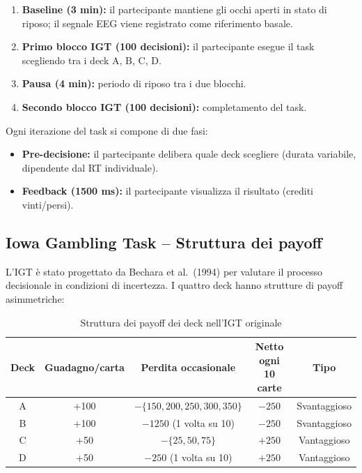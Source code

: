 \documentclass[12pt, a4paper]{article}
\begin{document}
\begin{enumerate}
    \item \textbf{Baseline (3 min):} il partecipante mantiene gli occhi aperti in stato di riposo; il segnale EEG viene registrato come riferimento basale.
    \item \textbf{Primo blocco IGT (100 decisioni):} il partecipante esegue il task scegliendo tra i deck A, B, C, D.
    \item \textbf{Pausa (4 min):} periodo di riposo tra i due blocchi.
    \item \textbf{Secondo blocco IGT (100 decisioni):} completamento del task.
\end{enumerate}

Ogni iterazione del task si compone di due fasi:
\begin{itemize}
    \item \textbf{Pre-decisione:} il partecipante delibera quale deck scegliere (durata variabile, dipendente dal RT individuale).
    \item \textbf{Feedback (1500 ms):} il partecipante visualizza il risultato (crediti vinti/persi).
\end{itemize}

\subsection{Iowa Gambling Task -- Struttura dei payoff}

L'IGT è stato progettato da Bechara et al.\ (1994) per valutare il processo decisionale in condizioni di incertezza. I quattro deck hanno strutture di payoff asimmetriche:

\begin{table}[h!]
\centering
\caption{Struttura dei payoff dei deck nell'IGT originale}
\begin{tabular}{ccccc}
\toprule
\textbf{Deck} & \textbf{Guadagno/carta} & \textbf{Perdita occasionale} & \textbf{Netto ogni 10 carte} & \textbf{Tipo} \\
\midrule
A & +100 & $-\{150,200,250,300,350\}$ & $-250$ & Svantaggioso \\
B & +100 & $-1250$ (1 volta su 10) & $-250$ & Svantaggioso \\
C & +50  & $-\{25,50,75\}$ & $+250$ & Vantaggioso \\
D & +50  & $-250$ (1 volta su 10) & $+250$ & Vantaggioso \\
\bottomrule
\end{tabular}
\end{table}
\end{document}
